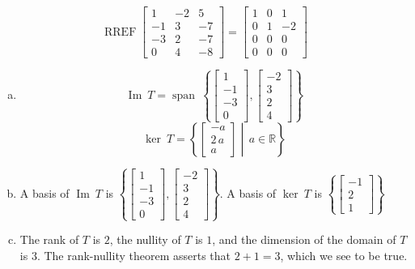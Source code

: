 \begin{exerciseAnswer} 


\[\operatorname{RREF} \left[\begin{array}{ccc}
1 & -2 & 5 \\
-1 & 3 & -7 \\
-3 & 2 & -7 \\
0 & 4 & -8
\end{array}\right] = \left[\begin{array}{ccc}
1 & 0 & 1 \\
0 & 1 & -2 \\
0 & 0 & 0 \\
0 & 0 & 0
\end{array}\right] \]


\begin{enumerate}[(a)]
\item \[\operatorname{Im}\ T = \operatorname{span}\  \left\{ \left[\begin{array}{c}
1 \\
-1 \\
-3 \\
0
\end{array}\right] , \left[\begin{array}{c}
-2 \\
3 \\
2 \\
4
\end{array}\right] \right\} \]\[\operatorname{ker}\ T =  \left\{ \left[\begin{array}{c}
-a \\
2 \, a \\
a
\end{array}\right] \middle|\,a\in\mathbb{R}\right\} \]
\item  A basis of \(\operatorname{Im}\ T\) is \( \left\{ \left[\begin{array}{c}
1 \\
-1 \\
-3 \\
0
\end{array}\right] , \left[\begin{array}{c}
-2 \\
3 \\
2 \\
4
\end{array}\right] \right\} \). A basis of \(\operatorname{ker}\ T\) is \( \left\{ \left[\begin{array}{c}
-1 \\
2 \\
1
\end{array}\right] \right\} \)
\item  The rank of \(T\) is \( 2 \), the nullity of \(T\) is \( 1 \), and the dimension of the domain of \(T\) is \( 3 \). The rank-nullity theorem asserts that \( 2 + 1 = 3 \), which we see to be true. 
\end{enumerate}
    
\end{exerciseAnswer}
    
